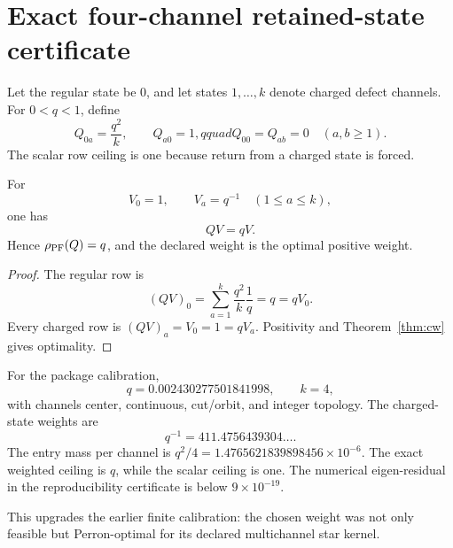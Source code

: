 \section{Exact four-channel retained-state certificate}

Let the regular state be \(0\), and let states \(1,\ldots,k\) denote charged
defect channels.  For \(0<q<1\), define
\begin{equation}
 Q_{0a}=\frac{q^2}{k},\qquad
 Q_{a0}=1,qquad
 Q_{00}=Q_{ab}=0\quad(a,b\ge1).
\end{equation}
The scalar row ceiling is one because return from a charged state is forced.

\begin{proposition}
For
\begin{equation}
 V_0=1,
 \qquad
 V_a=q^{-1}\quad(1\le a\le k),
\end{equation}
one has
\begin{equation}
 QV=qV.
\end{equation}
Hence \(\rho_{\mathrm{PF}}(Q)=q\), and the declared weight is the optimal positive
weight.
\end{proposition}

\begin{proof}
The regular row is
\[
 (QV)_0=\sum_{a=1}^k\frac{q^2}{k}\frac1q=q=qV_0.
\]
Every charged row is
\((QV)_a=V_0=1=qV_a\).  Positivity and
Theorem~\ref{thm:cw} gives optimality.
\end{proof}

For the package calibration,
\begin{equation}
 q=0.002430277501841998,
 \qquad k=4,
\end{equation}
with channels center, continuous, cut/orbit, and integer topology.  The
charged-state weights are
\begin{equation}
 q^{-1}=411.4756439304\ldots.
\end{equation}
The entry mass per channel is
\(q^2/4=1.4765621839898456\times10^{-6}\).  The exact weighted ceiling is
\(q\), while the scalar ceiling is one.  The numerical eigen-residual in the
reproducibility certificate is below \(9\times10^{-19}\).

This upgrades the earlier finite calibration: the chosen weight was not only
feasible but Perron-optimal for its declared multichannel star kernel.
